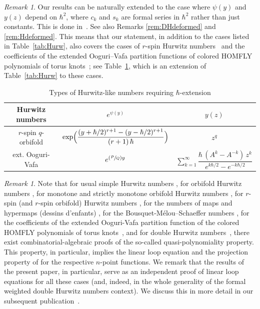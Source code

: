 \documentclass[JEP,XML,SOM,Unicode,NoEqCountersInSection,NoFloatCountersInSection]{cedram}
\newcommand{\Psfrac}[2]{(\sfrac{#1}{#2})}
\theoremstyle{plain}
\theoremstyle{definition}
\theoremstyle{remark}
\newtheorem{remark}[theorem]{Remark}
\begin{document}
\begin{remark}
Our results can be naturally extended to the case where $\psi(y)$ and $y(z)$ depend on $\hbar^2$, \ie where $c_k$ and $s_k$ are formal series in $\hbar^2$ rather than just constants. This is done in~\cite{BDKS21toprec}. See also Remarks \ref{rem:DHdeformed} and \ref{rem:Hdeformed}. This means that our statement, in addition to the cases listed in Table~\ref{tab:Hurw}, also covers \eg the cases of $r$-spin
Hurwitz numbers~\cite{KLPS19} and the coefficients of the extended Ooguri--Vafa partition functions of colored HOMFLY polynomials of torus knots~\cite{DPSS,DKPSS}; see Table~\ref{tab:Hurwext}, which is an extension of Table~\ref{tab:Hurw} to these cases.
\begin{table}[htb]
\caption{Types of Hurwitz-like numbers requiring $\hbar$-extension}
\label{tab:Hurwext}
\renewcommand{\arraystretch}{2.5}
\begin{tabular}{|c|c|c|}
\hline
Hurwitz numbers & $e^{\psi(y)}$ & $y(z)$\\
\hline
\hline
$r$-spin $q$-orbifold & $\exp\Bigl(\dfrac{(y+\hbar/2)^{r+1}-(y-\hbar/2)^{r+1}}{(r+1)\,\hbar}\Bigr)$ & $z^q$\\
\hline
ext. Ooguri-Vafa
& $e^{\Psfrac{P}{Q}y}$ & $\sum_{k=1}^\infty \dfrac{\hbar\,(A^k-A^{-k})\, z^k}{
e^{k\hbar/2}-e^{-k\hbar/2}
}$\\
\hline
\end{tabular}
\end{table}
\end{remark}

\begin{remark}\label{rem:combalg}
Note that for usual simple Hurwitz numbers \cite{DKOSS,KLS}, for orbifold Hurwitz numbers \cite{DLPS,KLS}, for monotone and strictly monotone orbifold Hurwitz numbers \cite{KLS}, for $r$-spin (and $r$-spin orbifold) Hurwitz numbers \cite{KLPS19}, for the numbers of maps and hypermaps (dessins d'enfants) \cite{KZ2015}, for the Bousquet-Mélou--Schaeffer numbers \cite{BDS}, for the coefficients of the extended Ooguri-Vafa partition function of the colored HOMFLY polynomials of torus knots~\cite{DPSS}, and for double Hurwitz numbers~\cite{BDKLM}, there \hbox{exist} combinatorial-algebraic proofs of the so-called quasi-polynomiality property. This property, in particular, implies the linear loop equation and the projection property of \cite{BS17} for the respective $n$-point functions. We remark that the results of the present paper, in particular, serve as an independent proof of linear loop equations for all these cases (and, indeed, in the whole generality of the formal weighted double Hurwitz numbers context). We discuss this in more detail in our subsequent publication~\cite{BDKS21toprec}.
\end{remark}
\end{document}
